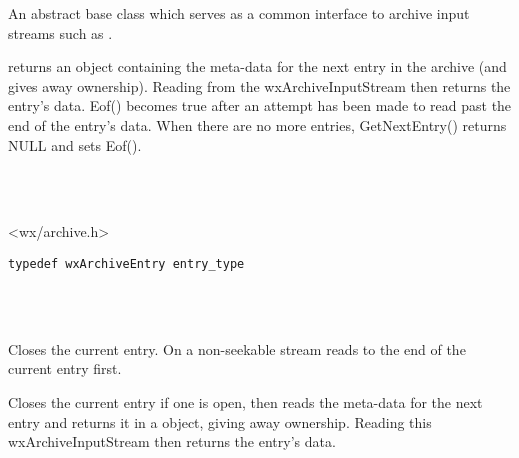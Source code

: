 An abstract base class which serves as a common interface to
archive input streams such as .

 returns an
  object containing the meta-data
for the next entry in the archive (and gives away ownership). Reading from
the wxArchiveInputStream then returns the entry's data. Eof() becomes true
after an attempt has been made to read past the end of the entry's data.
When there are no more entries, GetNextEntry() returns NULL and sets Eof().


\\
\\


<wx/archive.h>



\begin{verbatim}
typedef wxArchiveEntry entry_type
\end{verbatim}


\\
\\



\label{wxarchiveinputstreamcloseentry}


Closes the current entry. On a non-seekable stream reads to the end of
the current entry first.


\label{wxarchiveinputstreamgetnextentry}


Closes the current entry if one is open, then reads the meta-data for
the next entry and returns it in a 
object, giving away ownership. Reading this wxArchiveInputStream then
returns the entry's data.


